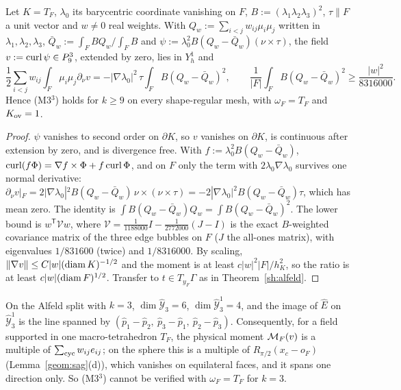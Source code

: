 \begin{proposition}\label{sh:bubble}
Let $K=T_F$, $\lambda_0$ its barycentric coordinate vanishing on $F$, $B:=(\lambda_1\lambda_2\lambda_3)^2$, $\tau\parallel F$ a unit vector and $w\ne0$ real weights. With $Q_w:=\sum_{i<j}w_{ij}\mu_i\mu_j$ written in $\lambda_1,\lambda_2,\lambda_3$, $\bar Q_w:=\int_FBQ_w/\int_FB$ and $\psi:=\lambda_0^2B(Q_w-\bar Q_w)(\nu\times\tau)$, the field $v:=\operatorname{curl}\psi\in P_9^3$, extended by zero, lies in $Y_h^1$ and
\[
\frac12\sum_{i<j}w_{ij}\int_F\mu_i\mu_j\partial_\nu v=-|\nabla\lambda_0|^2\,\tau\int_FB(Q_w-\bar Q_w)^2,\qquad\frac1{|F|}\int_FB(Q_w-\bar Q_w)^2\ge\frac{|w|^2}{8316000}.
\]
Hence (M3$^3$) holds for $k\ge9$ on every shape-regular mesh, with $\omega_F=T_F$ and $K_{\rm ov}=1$.
\end{proposition}

\begin{proof}
$\psi$ vanishes to second order on $\partial K$, so $v$ vanishes on $\partial K$, is continuous after extension by zero, and is divergence free. With $f:=\lambda_0^2B(Q_w-\bar Q_w)$, $\operatorname{curl}(f\Phi)=\nabla f\times\Phi+f\operatorname{curl}\Phi$, and on $F$ only the term with $2\lambda_0\nabla\lambda_0$ survives one normal derivative: $\partial_\nu v|_F=2|\nabla\lambda_0|^2B(Q_w-\bar Q_w)\,\nu\times(\nu\times\tau)=-2|\nabla\lambda_0|^2B(Q_w-\bar Q_w)\tau$, which has mean zero. The identity is $\int B(Q_w-\bar Q_w)Q_w=\int B(Q_w-\bar Q_w)^2$. The lower bound is $w^{\mathsf T}\mathcal Vw$, where $\mathcal V=\frac1{1188000}I-\frac1{2772000}(J-I)$ is the exact $B$-weighted covariance matrix of the three edge bubbles on $F$ ($J$ the all-ones matrix), with eigenvalues $1/831600$ (twice) and $1/8316000$. By scaling, $\lVert \nabla v\rVert\le C|w|(\operatorname{diam} K)^{-1/2}$ and the moment is at least $c|w|^2|F|/h_K^2$, so the ratio is at least $c|w|(\operatorname{diam} F)^{1/2}$. Transfer to $t\in T_{y_F}\Gamma$ as in Theorem~\ref{sh:alfeld}.
\end{proof}

\begin{proposition}[$k=3$: one macro-element is not enough]\label{sh:k3single}
On the Alfeld split with $k=3$, $\dim\hat{\mathcal Y}_3=6$, $\dim\hat{\mathcal Y}^1_3=4$, and the image of $\hat E$ on $\hat{\mathcal Y}^1_3$ is the line spanned by $(\hat p_1-\hat p_2,\ \hat p_3-\hat p_1,\ \hat p_2-\hat p_3)$. Consequently, for a field supported in one macro-tetrahedron $T_F$, the physical moment $\mathcal M_F(v)$ is a multiple of $\sum_{\rm cyc}w_{ij}e_{ij}$; on the sphere this is a multiple of $R_{\pi/2}(x_c-o_F)$ (Lemma~\ref{geom:sag}(d)), which vanishes on equilateral faces, and it spans one direction only. So (M3$^3$) cannot be verified with $\omega_F=T_F$ for $k=3$. 
\end{proposition}


